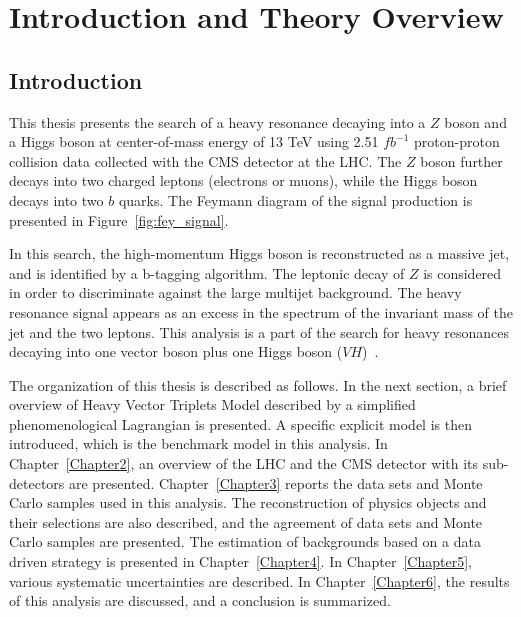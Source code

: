 
\newcommand{\tabhead}[1]{\textbf{#1}}
\newcommand{\mj}{$m_j$ }
\newcommand{\mzh}{$m_{ZH}$ }
\newcommand{\ttbar}{$t\bar{t}$ }
\newcommand{\Zjets}{$Z$+jets }
\newcommand{\Zee}{$Z\rightarrow e^+e^-$ }
\newcommand{\Zmm}{$Z\rightarrow \mu^+\mu^-$ }
\newcommand{\Hbb}{$H\rightarrow b\bar{b}$ }

\chapter{Introduction and Theory Overview} \label{Chapter1}

\section{Introduction}

This thesis presents the search of a heavy resonance decaying into a $Z$ boson and a Higgs boson at center-of-mass energy of 13 TeV using 2.51 $fb^{-1}$ proton-proton collision data collected with the CMS detector at the LHC. The $Z$ boson further decays into two charged leptons (electrons or muons), while the Higgs boson decays into two $b$ quarks. The Feymann diagram of the signal production is presented in Figure~\ref{fig:fey_signal}.

In this search, the high-momentum Higgs boson is reconstructed as a massive jet, and is identified by a b-tagging algorithm. The leptonic decay of $Z$ is considered in order to discriminate against the large multijet background. The heavy resonance signal appears as an excess in the spectrum of the invariant mass of the jet and the two leptons. This analysis is a part of the search for heavy resonances decaying into one vector boson plus one Higgs boson ($VH$)~\cite{Khachatryan:2016cfx}.

The organization of this thesis is described as follows. In the next section, a brief overview of Heavy Vector Triplets Model described by a simplified phenomenological Lagrangian is presented. A specific explicit model is then introduced, which is the benchmark model in this analysis. In Chapter~\ref{Chapter2}, an overview of the LHC and the CMS detector with its sub-detectors are presented. Chapter~\ref{Chapter3} reports the data sets and Monte Carlo samples used in this analysis. The reconstruction of physics objects and their selections are also described, and the agreement of data sets and Monte Carlo samples are presented. The estimation of backgrounds based on a data driven strategy is presented in Chapter~\ref{Chapter4}. In Chapter~\ref{Chapter5}, various systematic uncertainties are described. In Chapter~\ref{Chapter6}, the results of this analysis are discussed, and a conclusion is summarized.


